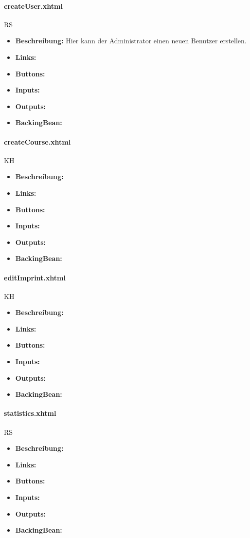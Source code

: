 				\paragraph{createUser.xhtml}
					RS\\
					\begin{itemize}
						\item \textbf{Beschreibung:} Hier kann der Administrator einen neuen Benutzer erstellen.
						\item \textbf{Links:}
						\item \textbf{Buttons:}
						\item \textbf{Inputs:}
						\item \textbf{Outputs:}
						\item \textbf{BackingBean:}
					\end{itemize}
				
				\paragraph{createCourse.xhtml}
					KH\\
					\begin{itemize}
						\item \textbf{Beschreibung:}
						\item \textbf{Links:}
						\item \textbf{Buttons:}
						\item \textbf{Inputs:}
						\item \textbf{Outputs:}
						\item \textbf{BackingBean:}
					\end{itemize}
				
				\paragraph{editImprint.xhtml}
					KH\\
					\begin{itemize}
						\item \textbf{Beschreibung:}
						\item \textbf{Links:}
						\item \textbf{Buttons:}
						\item \textbf{Inputs:}
						\item \textbf{Outputs:}
						\item \textbf{BackingBean:}
					\end{itemize}
				
				\paragraph{statistics.xhtml}
					RS\\
					\begin{itemize}
						\item \textbf{Beschreibung:}
						\item \textbf{Links:}
						\item \textbf{Buttons:}
						\item \textbf{Inputs:}
						\item \textbf{Outputs:}
						\item \textbf{BackingBean:}
					\end{itemize}